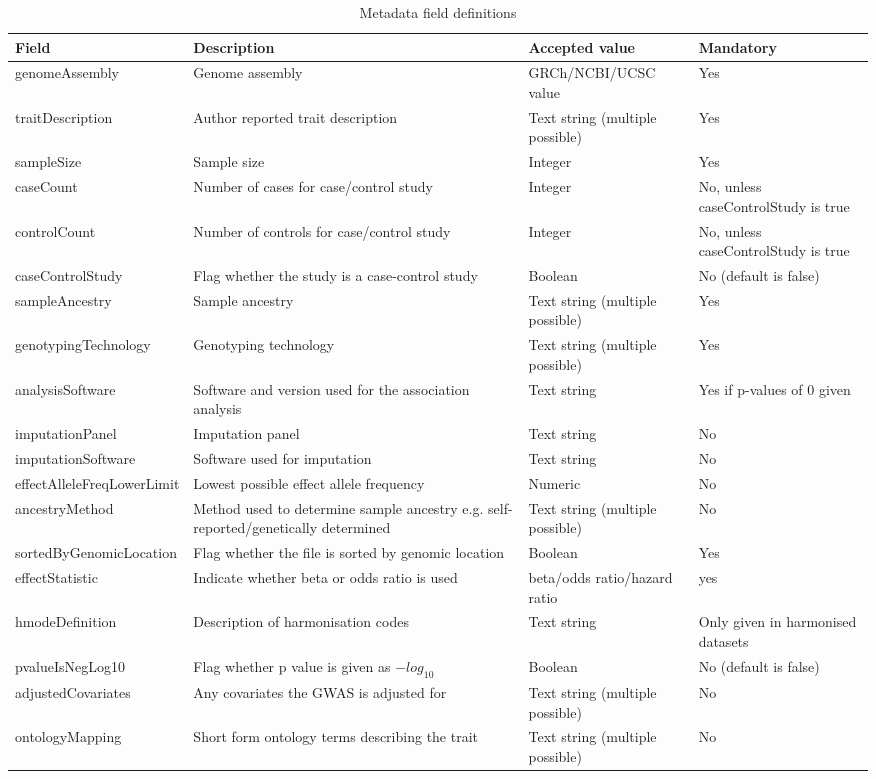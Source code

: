 \documentclass[11pt]{article}
\begin{document}
\begin{table}[h]
 \caption{Metadata field definitions}
 \centering
 \begin{tabularx}{\textwidth} { 
   | >{\hsize=1.4\hsize\centering\arraybackslash}X 
   | >{\hsize=1\hsize\centering\arraybackslash}X 
   | >{\hsize=1\hsize\centering\arraybackslash}X 
   | >{\hsize=0.6\hsize\centering\arraybackslash}X | } 
  \hline
  Field & Description & Accepted value & Mandatory \\
  \hline
  genomeAssembly & Genome assembly & GRCh/NCBI/UCSC value & Yes\\
  traitDescription & Author reported trait description & Text string (multiple possible) & Yes\\
  sampleSize & Sample size & Integer & Yes\\
  caseCount & Number of cases for case/control study & Integer & No, unless caseControlStudy is true\\
  controlCount & Number of controls for case/control study & Integer & No, unless caseControlStudy is true\\
  caseControlStudy & Flag whether the study is a case-control study & Boolean & No (default is false)\\
  sampleAncestry & Sample ancestry & Text string (multiple possible) & Yes\\
  genotypingTechnology & Genotyping technology & Text string (multiple possible) & Yes\\
  analysisSoftware & Software and version used for the association analysis & Text string & Yes if p-values of 0 given\\
  imputationPanel & Imputation panel & Text string & No\\
  imputationSoftware & Software used for imputation & Text string & No\\
  effectAlleleFreqLowerLimit & Lowest possible effect allele frequency & Numeric & No\\
  ancestryMethod & Method used to determine sample ancestry e.g. self-reported/genetically determined  & Text string (multiple possible) & No\\
  sortedByGenomicLocation & Flag whether the file is sorted by genomic location & Boolean & Yes\\
  effectStatistic & Indicate whether beta or odds ratio is used & beta/odds ratio/hazard ratio & yes\\
  hmodeDefinition & Description of harmonisation codes & Text string & Only given in harmonised datasets\\
  pvalueIsNegLog10 & Flag whether p value is given as $-log_{10}$ & Boolean & No (default is false)\\
  adjustedCovariates & Any covariates the GWAS is adjusted for & Text string (multiple possible) & No\\
  ontologyMapping & Short form ontology terms describing the trait & Text string (multiple possible) & No\\
  \hline
 \end{tabularx}
\end{table}
\end{document}
